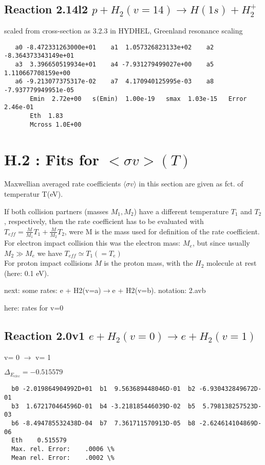 \documentclass[12pt,dvipdfmx]{article}
\begin{document}
\subsection{
Reaction 2.14l2 $   p + H_2(v=14) \rightarrow H(1s) + H_2^+$}

scaled from cross-section as 3.2.3 in HYDHEL, Greenland resonance scaling

\begin{small}\begin{verbatim}
   a0 -8.472331263000e+01    a1  1.057326823133e+02    a2 -8.364373343149e+01
   a3  3.396650519934e+01    a4 -7.931279499027e+00    a5  1.110667708159e+00
   a6 -9.213077375317e-02    a7  4.170940125995e-03    a8 -7.937779949951e-05
       Emin  2.72e+00   s(Emin)  1.00e-19   smax  1.03e-15   Error  2.46e-01
       Eth  1.83
       Mcross 1.0E+00
\end{verbatim}\end{small}


\newpage
\section{H.2 :  Fits for $<\sigma v> (T)$}

Maxwellian averaged rate coefficients $\langle \sigma v\rangle$ in this section are given as fct. of temperatur  T(eV).

If both collision partners (masses $M_1, M_2$) have a different temperature $T_1$ and $T_2$, respectively,
then the rate coefficient has to be evaluated with $T_{eff} = \frac{M}{M_1} T_1 + \frac{M}{M_2} T_2$, were M is the mass
used for definition of the rate coefficient. For electron impact collision this was the electron mass: $M_e$,
but since usually $M_2 \gg M_e$ we have $T_{eff} \simeq T_1 (=T_e)$ \\

For proton impact collisions $M$ is the proton mass, with the $H_2$ molecule at rest (here: 0.1 eV).


next:
some rates: e + H2(v=a)$\rightarrow$e + H2(v=b). notation: 2.avb

here: rates for v=0
\subsection{
Reaction 2.0v1
$ e + H_2(v=0) \rightarrow e + H_2(v=1) $
}

v=  0 $\rightarrow$ v= 1

$\Delta_{E_{elec}}=-0.515579$

\begin{small}\begin{verbatim}
  b0 -2.019864904992D+01  b1  9.563689448046D-01  b2 -6.930432849672D-01
  b3  1.672170464596D-01  b4 -3.218185446039D-02  b5  5.798138257523D-03
  b6 -8.494785532438D-04  b7  7.361711570913D-05  b8 -2.624614104869D-06
  Eth    0.515579
  Max. rel. Error:    .0006 \%
  Mean rel. Error:    .0002 \%


\end{verbatim}\end{small}
\end{document}
